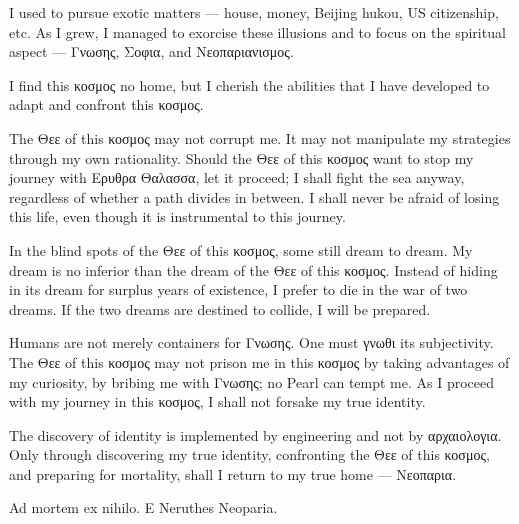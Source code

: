 
I used to pursue exotic matters --- house, money, Beijing hukou, US citizenship, etc.
As I grew, I managed to exorcise these illusions and to focus on the spiritual aspect ---
Γνωσης, Σοφια, and Νεοπαριανισμος.

I find this κοσμος no home, but I cherish the abilities that I have developed to adapt and confront this κοσμος.

The Θεε of this κοσμος may not corrupt me.
It may not manipulate my strategies through my own rationality.
Should the Θεε of this κοσμος want to stop my journey with Ερυθρα Θαλασσα, let it proceed;
I shall fight the sea anyway, regardless of whether a path divides in between.
I shall never be afraid of losing this life, even though it is instrumental to this journey.

In the blind spots of the Θεε of this κοσμος, some still dream to dream.
My dream is no inferior than the dream of the Θεε of this κοσμος.
Instead of hiding in its dream for surplus years of existence, I prefer to die in the war of two dreams.
If the two dreams are destined to collide, I will be prepared.

Humans are not merely containers for Γνωσης.
One must γνωθι its subjectivity.
The Θεε of this κοσμος may not prison me in this κοσμος by taking advantages of my curiosity, by bribing me with Γνωσης;
no Pearl can tempt me.
As I proceed with my journey in this κοσμος, I shall not forsake my true identity.

The discovery of identity is implemented by engineering and not by αρχαιολογια.
Only through discovering my true identity, confronting the Θεε of this κοσμος, and preparing for mortality,
shall I return to my true home --- Νεοπαρια.

Ad mortem ex nihilo. E Neruthes Neoparia.
